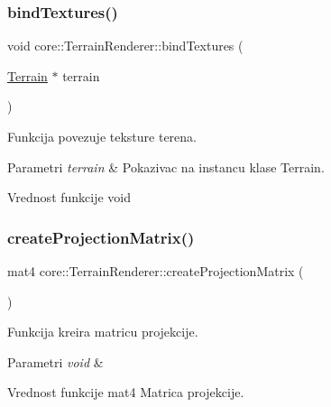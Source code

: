 \subsubsection{\texorpdfstring{bind\+Textures()}{bindTextures()}}
{\footnotesize\ttfamily void core\+::\+Terrain\+Renderer\+::bind\+Textures (\begin{DoxyParamCaption}\item[{\hyperlink{classterrain_1_1Terrain}{Terrain} $\ast$}]{terrain }\end{DoxyParamCaption})}



Funkcija povezuje teksture terena. 


\begin{DoxyParams}{Parametri}
{\em terrain} & Pokazivac na instancu klase Terrain. \\
\hline
\end{DoxyParams}
\begin{DoxyReturn}{Vrednost funkcije}
void 
\end{DoxyReturn}
\mbox{\label{classcore_1_1TerrainRenderer_a06f89d76316964a8da14498ec43756f0}} 
\subsubsection{\texorpdfstring{create\+Projection\+Matrix()}{createProjectionMatrix()}}
{\footnotesize\ttfamily mat4 core\+::\+Terrain\+Renderer\+::create\+Projection\+Matrix (\begin{DoxyParamCaption}{ }\end{DoxyParamCaption})\hspace{0.3cm}{\ttfamily [private]}}



Funkcija kreira matricu projekcije. 


\begin{DoxyParams}{Parametri}
{\em void} & \\
\hline
\end{DoxyParams}
\begin{DoxyReturn}{Vrednost funkcije}
mat4 Matrica projekcije. 
\end{DoxyReturn}
\mbox{\label{classcore_1_1TerrainRenderer_a5e1837566f4de6e49dbf19e203cc9563}} 

